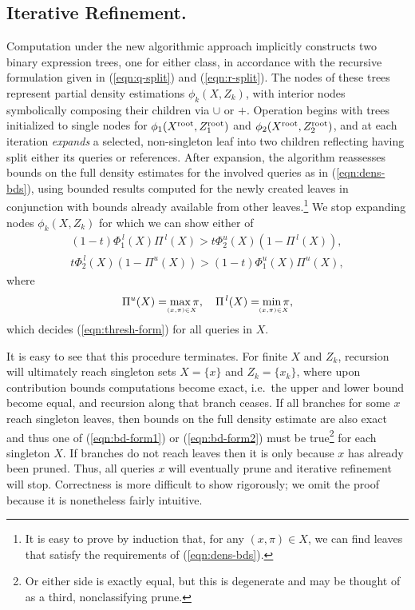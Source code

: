 \documentclass[twoside,leqno,twocolumn]{article}
\newcommand{\kdroot}[1]{#1^{\rm root}}
\newcommand{\lo}[1]{#1^{\,l}}
\newcommand{\hi}[1]{#1^u}
\newcommand{\leftlim}[1]{\lefteqn{\scriptscriptstyle #1}}
\begin{document}
\subsection{Iterative Refinement.}
Computation under the new algorithmic approach implicitly constructs
two binary expression trees, one for either class, in accordance with
the recursive formulation given in (\ref{eqn:q-split}) and
(\ref{eqn:r-split}).  The nodes of these trees represent partial
density estimations $\phi_k(X,Z_k)$, with interior nodes symbolically
composing their children via $\cup$ or $+$.  Operation begins with
trees initialized to single nodes for
$\phi_1(\kdroot{X},\kdroot{Z_1})$ and
$\phi_2(\kdroot{X},\kdroot{Z_2})$, and at each iteration {\em expands}
a selected, non-singleton leaf into two children reflecting having
split either its queries or references.  After expansion, the
algorithm reassesses bounds on the full density estimates for the
involved queries as in (\ref{eqn:dens-bds}), using bounded results
computed for the newly created leaves in conjunction with bounds
already available from other leaves.\footnote{It is easy to prove by
induction that, for any $(x,\pi) \in X$, we can find leaves that satisfy
the requirements of (\ref{eqn:dens-bds}).}  We stop expanding nodes
$\phi_k(X,Z_k)$ for which we can show either of
\begin{align}
  \label{eqn:bd-form1} (1-t)\lo{\Phi_1}(X)\lo{\Pi}(X) > t\hi{\Phi_2}(X)(1-\lo{\Pi}(X)) , \\
  \label{eqn:bd-form2} t\lo{\Phi_2}(X)(1-\hi{\Pi}(X)) > (1-t)\hi{\Phi_1}(X)\hi{\Pi}(X) ,
\end{align}
where
\begin{equation}
  \hi{\Pi}(X) = \max_{\leftlim{(x,\pi) \in X}} \pi , \quad \lo{\Pi}(X) = \min_{\leftlim{(x,\pi) \in X}} \pi ,
\end{equation}
which decides (\ref{eqn:thresh-form}) for all queries in $X$.

It is easy to see that this procedure terminates.  For finite $X$ and
$Z_k$, recursion will ultimately reach singleton sets $X = \{x\}$ and
$Z_k = \{x_k\}$, where upon contribution bounds computations become
exact, i.e.~the upper and lower bound become equal, and recursion
along that branch ceases.  If all branches for some $x$ reach
singleton leaves, then bounds on the full density estimate are also
exact and thus one of (\ref{eqn:bd-form1}) or (\ref{eqn:bd-form2})
must be true\footnote{Or either side is exactly equal, but this is
degenerate and may be thought of as a third, nonclassifying prune.}
for each singleton $X$.  If branches do not reach leaves then it is
only because $x$ has already been pruned.  Thus, all queries $x$ will
eventually prune and iterative refinement will stop.  Correctness is
more difficult to show rigorously; we omit the proof because it is
nonetheless fairly intuitive.
\end{document}
